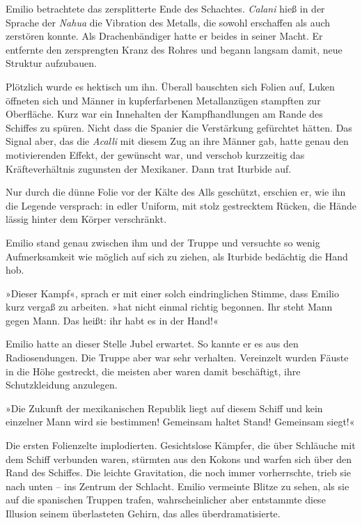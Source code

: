 Emilio betrachtete das zersplitterte Ende des Schachtes. \textit{Calani}
hieß in der Sprache der \textit{Nahua} die Vibration des Metalls, die sowohl
erschaffen als auch zerstören konnte. Als Drachenbändiger hatte er
beides in seiner Macht. Er entfernte den zersprengten Kranz des
Rohres und begann langsam damit, neue Struktur aufzubauen.

\bigpar

Plötzlich wurde es hektisch um ihn. Überall bauschten sich Folien
auf, Luken öffneten sich und Männer in kupferfarbenen Metallanzügen
stampften zur Oberfläche. Kurz war ein Innehalten der
Kampfhandlungen am Rande des Schiffes zu spüren. Nicht dass die
Spanier die Verstärkung gefürchtet hätten. Das Signal aber, das die
\textit{Acalli} mit diesem Zug an ihre Männer gab, hatte genau den
motivierenden Effekt, der gewünscht war, und verschob kurzzeitig
das Kräfteverhältnis zugunsten der Mexikaner. Dann trat Iturbide
auf.

Nur durch die dünne Folie vor der Kälte des Alls geschützt,
erschien er, wie ihn die Legende versprach: in edler Uniform, mit
stolz gestrecktem Rücken, die Hände lässig hinter dem Körper
verschränkt.

Emilio stand genau zwischen ihm und der Truppe und versuchte so
wenig Aufmerksamkeit wie möglich auf sich zu ziehen, als Iturbide
bedächtig die Hand hob.

»Dieser Kampf«, sprach er mit einer solch eindringlichen Stimme,
dass Emilio kurz vergaß zu arbeiten. »hat nicht einmal richtig
begonnen. Ihr steht Mann gegen Mann. Das heißt: ihr habt es in der
Hand!«

Emilio hatte an dieser Stelle Jubel erwartet. So kannte er es aus
den Radiosendungen. Die Truppe aber war sehr verhalten. Vereinzelt
wurden Fäuste in die Höhe gestreckt, die meisten aber waren damit
beschäftigt, ihre Schutzkleidung anzulegen.

»Die Zukunft der mexikanischen Republik liegt auf diesem Schiff und
kein einzelner Mann wird sie bestimmen! Gemeinsam haltet Stand!
Gemeinsam siegt!«

Die ersten Folienzelte implodierten. Gesichtslose Kämpfer, die über
Schläuche mit dem Schiff verbunden waren, stürmten aus den Kokons
und warfen sich über den Rand des Schiffes. Die leichte
Gravitation, die noch immer vorherrschte, trieb sie nach unten –
ins Zentrum der Schlacht. Emilio vermeinte Blitze zu sehen, als sie
auf die spanischen Truppen trafen, wahrscheinlicher aber entstammte
diese Illusion seinem überlasteten Gehirn, das alles
überdramatisierte.

